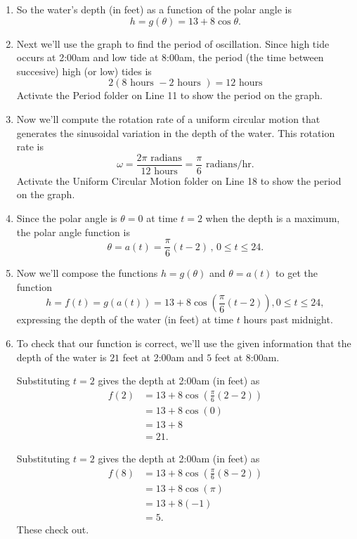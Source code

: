 \documentclass{ximera}
\begin{document}
\begin{example}
\begin{explanation}
\begin{enumerate}
\item So the water's depth (in feet) as a function of the polar angle is
\[
   h = g(\theta) = 13 + 8\cos\theta.
\]

\item  Next we'll use the graph to find the period of oscillation. Since high tide occurs at 2:00am and low tide at 8:00am, the period (the time between succesive) high (or low) tides is
\[
    2(8 \text{ hours } - 2 \text{ hours }) = 12 \text{ hours}
\]
Activate the Period folder on Line 11 to show the period on the graph.

\item  Now we'll compute the rotation rate of a uniform circular motion that generates the sinusoidal variation in the depth of the water. This rotation rate is
\[
  \omega = \frac{2\pi \text{ radians}}{12 \text{ hours}} = \frac{\pi}{6} \text{ radians/hr} .
\]
Activate the Uniform Circular Motion folder on Line 18 to show the period on the graph.

\item Since the polar angle is $\theta=0$ at time $t=2$ when the depth is a maximum, the polar angle function is
\[
   \theta = a(t) = \frac{\pi}{6}\left( t - 2 \right) \, , \, 0\leq t \leq 24.
\]

\item  Now we'll compose the functions $h=g(\theta)$ and $\theta = a(t)$ to get the function
\[
   h  = f(t) = g(a(t)) =  13 + 8 \cos \left(  \frac{\pi}{6} \left( t - 2 \right) \right),  0\leq t \leq 24,
\]
expressing the depth of the water (in feet) at time $t$ hours past midnight. 

\item  To check that our function is correct, we'll use the given information that the depth of the water is $21$ feet at 2:00am and $5$ feet at 8:00am.

Substituting $t=2$ gives the depth at 2:00am (in feet) as
\begin{align*}
   f(2)   & = 13 + 8 \cos \left(  \frac{\pi}{6} \left( 2 - 2 \right) \right) \\ 
           & = 13 + 8 \cos (0)  \\ 
           & = 13 + 8 \\
           & = 21 .
\end{align*}

Substituting $t=2$ gives the depth at 2:00am (in feet) as
\begin{align*}
   f(8)   & = 13 + 8 \cos \left(  \frac{\pi}{6} \left(8 - 2 \right) \right) \\ 
           & = 13 + 8 \cos (\pi)  \\ 
           & = 13 + 8(-1) \\
           & = 5 .
\end{align*}
These check out.


\end{enumerate}
\end{explanation}
\end{example}
\end{document}
